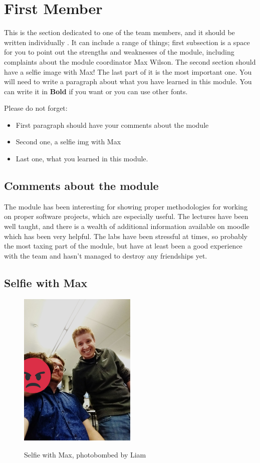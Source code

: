 \section{First Member}
This is the section dedicated to one of the team members, and it should be written individually . It can include a range of things; first subsection is a space for you to point out the strengths and weaknesses of the module, including complaints about the module coordinator Max Wilson. The second section should have a selfie image with Max! The last part of it is the most important one. You will need to write a paragraph about what you have learned in this module. You can write it in \textbf{Bold} if you want or you can use other fonts. 

Please do not forget:
\begin{itemize}
	\item First paragraph should have your comments about the module
	\item Second one, a selfie img with Max
	\item Last one, what you learned in this module.
\end{itemize}

\subsection{Comments about the module}
The module has been interesting for showing proper methodologies for working on proper software projects, which are especially useful. The lectures have been well taught, and there is a wealth of additional information available on moodle which has been very helpful. The labs have been stressful at times, so probably the most taxing part of the module, but have at least been a good experience with the team and hasn't managed to destroy any friendships yet.

\subsection{Selfie with Max}

\begin{figure}[h]
\caption{Selfie with Max, photobombed by Liam}
\centering
\includegraphics[width=0.5\textwidth]{MaxSelfie1.jpg}
\label{fig:selfie}
\end{figure}


